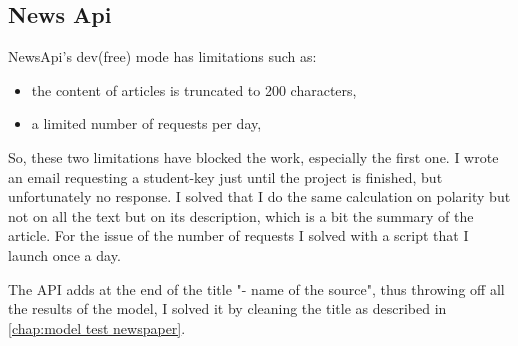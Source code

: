 \subsection{News Api}
NewsApi's dev(free) mode has limitations such as:
\begin{itemize}
    \item the content of articles is truncated to 200 characters,
    \item a limited number of requests per day,
\end{itemize}
So, these two limitations have blocked the work, especially the first one.
I wrote an email requesting a student-key just until the project is finished, but unfortunately no response.
I solved that I do the same calculation on polarity but not on all the text but on its description, which is a bit the summary of the article.
For the issue of the number of requests I solved with a script that I launch once a day.

The API adds at the end of the title "- name of the source", thus throwing off all the results of the model, I solved it by cleaning the title as described in \autoref{chap:model test newspaper}.